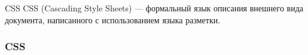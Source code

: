 \begin{frame}{CSS}
CSS (Cascading Style Sheets) — формальный язык описания внешнего вида документа, написанного с использованием языка разметки.
\end{frame}
\begin{frame}[fragile]
 	\frametitle{CSS}
    
\end{frame}
